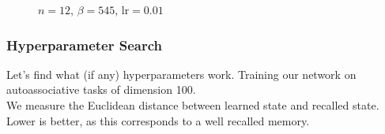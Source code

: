 \begin{frame}
{\begin{figure}
    \caption{\(n=12\), \(\beta=545\), \(\text{lr}=0.01\)}
    \end{figure}
}
\end{frame}


\begin{frame}
    \frametitle{Hyperparameter Search}
    Let's find what (if any) hyperparameters work. Training our network on autoassociative tasks of dimension 100. \\

    We measure the Euclidean distance between learned state and recalled state. Lower is better, as this corresponds to a well recalled memory.
\end{frame}

